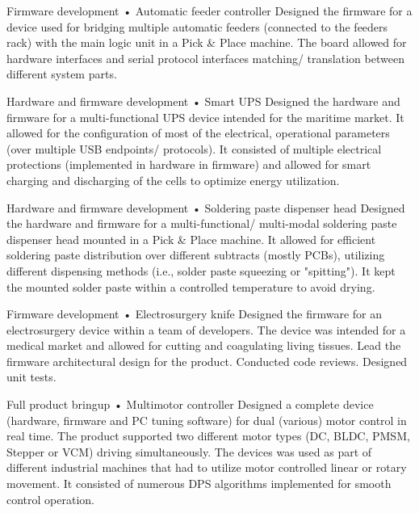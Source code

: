 \documentclass{tccv}
\begin{document}
\begin{yearlist}
     
\item[Firmware development]{•}
     {Automatic feeder controller}
     {Designed the firmware for a device used for bridging multiple automatic feeders (connected to the feeders rack) with the main logic unit in a Pick \& Place machine. The board allowed for hardware interfaces and serial protocol interfaces matching/ translation between different system parts.}
     
\item[Hardware and firmware development]{•}
     {Smart UPS}
     {Designed the hardware and firmware for a multi-functional UPS device intended for the maritime market. It allowed for the configuration of most of the electrical, operational parameters (over multiple USB endpoints/ protocols). It consisted of multiple electrical protections (implemented in hardware in firmware) and allowed for smart charging and discharging of the cells to optimize energy utilization.}
     
\item[Hardware and firmware development]{•}
     {Soldering paste dispenser head}
     {Designed the hardware and firmware for a multi-functional/ multi-modal soldering paste dispenser head mounted in a Pick \& Place machine. It allowed for efficient soldering paste distribution over different subtracts (mostly PCBs), utilizing different dispensing methods (i.e., solder paste squeezing or "spitting"). It kept the mounted solder paste within a controlled temperature to avoid drying.}
     
\item[Firmware development]{•}
     {Electrosurgery knife}
     {Designed the firmware for an electrosurgery device within a team of developers. The device was intended for a medical market and allowed for cutting and coagulating living tissues. Lead the firmware architectural design for the product. Conducted code reviews. Designed unit tests.}     
     
\item[Full product bringup]{•}
     {Multimotor controller}
     {Designed a complete device (hardware, firmware and PC tuning software) for dual (various) motor control in real time. The product supported two different motor types (DC, BLDC, PMSM, Stepper  or VCM) driving simultaneously. The devices was used as part of different industrial machines that had to utilize motor controlled linear or rotary movement. It consisted of numerous DPS algorithms implemented for smooth control operation.}  
     

\end{yearlist}
\end{document}
